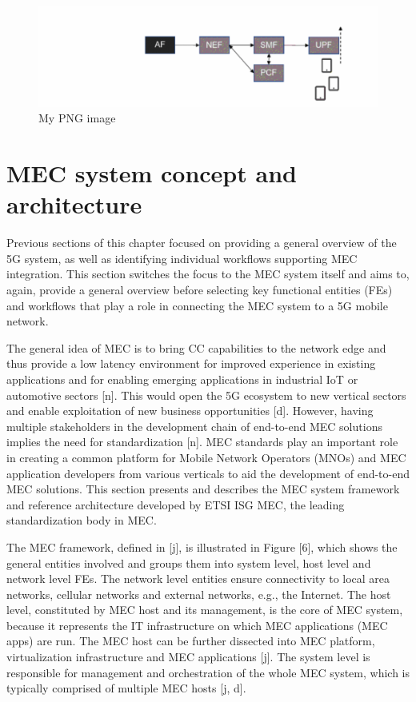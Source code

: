 \documentclass[12pt,a4paper,twoside]{report}
\begin{document}
\begin{figure}[ht]
	\centering
	\includegraphics[width=15cm]{./images/NEF-callflow.png}
	\caption{My PNG image}
\end{figure}

\section{MEC system concept and architecture}
Previous sections of this chapter focused on providing a general overview of the 5G system, as well as identifying individual workflows supporting MEC integration. This section switches the focus to the MEC system itself and aims to, again, provide a general overview before selecting key functional entities (FEs) and workflows that play a role in connecting the MEC system to a 5G mobile network. 

The general idea of MEC is to bring CC capabilities to the network edge and thus provide a low latency environment for improved experience in existing applications and for enabling emerging applications in industrial IoT or automotive sectors [n]. This would open the 5G ecosystem to new vertical sectors and enable exploitation of new business opportunities [d]. However, having multiple stakeholders in the development chain of end-to-end MEC solutions implies the need for standardization [n]. MEC standards play an important role in creating a common platform for Mobile Network Operators (MNOs) and MEC application developers from various verticals to aid the development of end-to-end MEC solutions. This section presents and describes the MEC system framework and reference architecture developed by ETSI ISG MEC, the leading standardization body in MEC. 

The MEC framework, defined in [j], is illustrated in Figure [6], which shows the general entities involved and groups them into system level, host level and network level FEs. The network level entities ensure connectivity to local area networks, cellular networks and external networks, e.g., the Internet. The host level, constituted by MEC host and its management, is the core of MEC system, because it represents the IT infrastructure on which MEC applications (MEC apps) are run. The MEC host can be further dissected into MEC platform, virtualization infrastructure and MEC applications [j]. The system level is responsible for management and orchestration of the whole MEC system, which is typically comprised of multiple MEC hosts [j, d].
\end{document}
